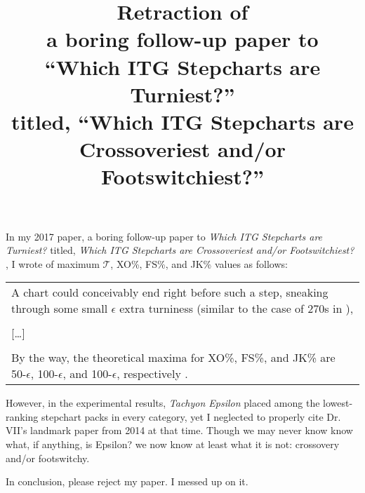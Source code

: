 \documentclass[onecolumn]{sigplanconf}
\begin{document}
\copyrightdata{}


\title{
Retraction of \\
a boring follow-up paper to \\
``Which ITG Stepcharts are Turniest?'' \\
titled, ``Which ITG Stepcharts are Crossoveriest and/or Footswitchiest?'' \\
}


\maketitle

In my 2017 paper, a boring follow-up paper to {\em Which ITG Stepcharts are Turniest?} titled,
{\em Which ITG Stepcharts are Crossoveriest and/or Footswitchiest?} \cite{crossoveriness},
I wrote of maximum $\mathcal{T}$, XO\%, FS\%, and JK\% values as follows:

\begin{center}
\begin{tabular}{p{}}
	A chart could conceivably end right before such a step,
	sneaking through some small $\epsilon$ extra turniness \cite{epsilon}
	(similar to the case of 270s in \cite{turniness}),
	\\
	\\
	{[\dots]}
	\\
	\\
	By the way, the theoretical maxima for XO\%, FS\%, and JK\%
	are 50-$\epsilon$, 100-$\epsilon$, and 100-$\epsilon$, respectively \cite{epsilon}.
\end{tabular}
\end{center}

\noindent
However,
in the experimental results, {\em Tachyon Epsilon} \cite{tachyon-epsilon}
placed among the lowest-ranking stepchart packs in every category,
yet I neglected to properly cite Dr. VII's landmark paper from 2014 at that time.
Though we may never know know what, if anything, is Epsilon?
we now know at least what it is not: crossovery and/or footswitchy.

In conclusion, please reject my paper.
I messed up on it.




\end{document}
